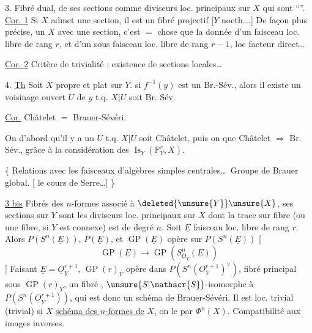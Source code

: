 3. Fibré dual,  de ses sections comme diviseurs loc. principaux sur $X$ qui sont ``''. \uline{Cor. 1} Si $X$ admet une section, il est un fibré projectif [$Y$ noeth.\ldots] De façon plus précise, un $X$  avec une section, c'est  $=$ chose que la donnée d'un  faisceau loc. libre de rang $r$, et d'un sous faisceau loc. libre de rang $r-1$, loc facteur direct\ldots

\uline{Cor. 2}  Critère de  trivialité : existence de sections locales\ldots

4. \uline{Th} Soit $X$ propre et plat sur $Y$.  si $f^{-1}(y)$ est un Br.-Sév., alors il existe un voisinage ouvert $U$ de $y$ t.q. $X|U$ soit Br. Sév.

\uline{Cor.} Châtelet $=$ Brauer-Sévéri.

On  d'abord qu'il y a un $U$ t.q. $X|U$ soit Châtelet, puis on   que Châtelet $\Rightarrow$ Br. Sév., grâce à la considération des $\operatorname{Is}_{Y}(\mathbb{P}^{r}_{Y},X)$.

\{ Relations avec les faisceaux d'algèbres simples centrales\ldots\ Groupe de Brauer global. [ le cours de Serre\ldots] \}

\uline{3 bis} Fibrés des $n$-formes associé à $\deleted{\unsure{Y}}\unsure{X}$, ses sections sur $Y$ sont les diviseurs loc. principaux sur $X$ dont la trace sur  fibre (ou une fibre, si $Y$ est connexe) est de degré $n$.
Soit $\underline{E}$ faisceau loc. libre de rang $r$. Alors  $P(S^n(\underline{E}))$,   $P(\underline{E})$,  et $\operatorname{GP}(\underline{E})$ opère sur $P(S^n(\underline{E}))$   [
\[
\operatorname{GP}(\underline{E})\longrightarrow\operatorname{GP}(S^n_{\underline{O}_{Y}}(\underline{E}))
\]
] Faisant $\underline{E}=\underline{O}_{Y}^{r+1}$,  $\operatorname{GP}(r)_{Y}$ opère dans $P(S^n(O_{Y}^{r+1})^{\vee})$,   fibré principal  sous $\operatorname{GP}(r)_{Y}$,  un fibré  , $\unsure{S|\mathscr{S}}$-isomorphe à $P(S^n(\underline{O}_{Y}^{r+1}))$, qui est donc un schéma de Brauer-Sévéri. Il est loc. trivial (trivial) si $X$   \uline{schéma des $n$-formes de} $X$, on le  par $\Phi^n(X)$. Compatibilité aux images inverses.

